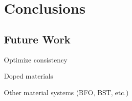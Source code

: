 \chapter{Conclusions}
\label{ch:Conc}
\thispagestyle{empty}


\section{Future Work}
\label{sec:Conc-Future}

Optimize consistency

Doped materials

Other material systems (BFO, BST, etc.)


\lipsum









